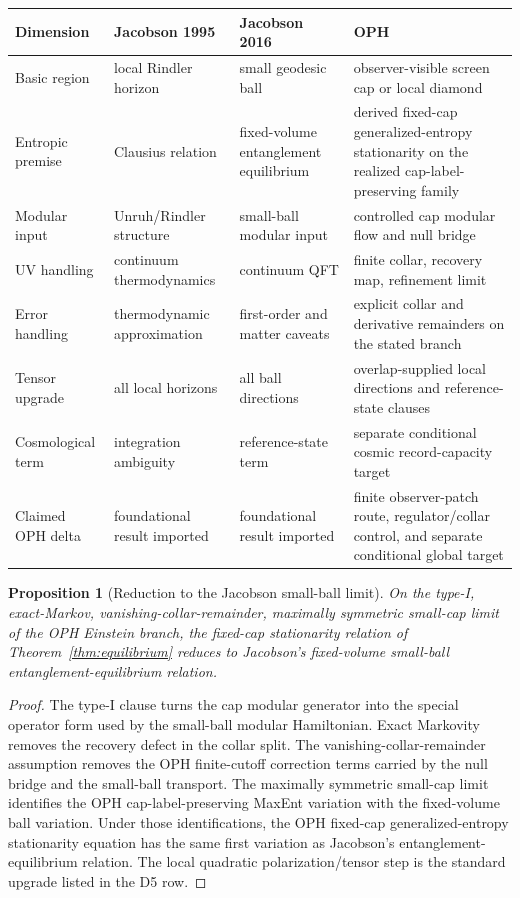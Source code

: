 \documentclass[11pt]{article}
\newtheorem{proposition}[theorem]{Proposition}
\begin{document}
\begingroup
\footnotesize
\begin{longtable}{@{}>{\raggedright\arraybackslash}p{}>{\raggedright\arraybackslash}p{}>{\raggedright\arraybackslash}p{}>{\raggedright\arraybackslash}p{}@{}}
\toprule
Dimension & Jacobson 1995 & Jacobson 2016 & OPH \\
\midrule
\endhead
\bottomrule
\endfoot
Basic region & local Rindler horizon & small geodesic ball & observer-visible screen cap or local diamond \\
Entropic premise & Clausius relation & fixed-volume entanglement equilibrium & derived fixed-cap generalized-entropy stationarity on the realized cap-label-preserving family \\
Modular input & Unruh/Rindler structure & small-ball modular input & controlled cap modular flow and null bridge \\
UV handling & continuum thermodynamics & continuum QFT & finite collar, recovery map, refinement limit \\
Error handling & thermodynamic approximation & first-order and matter caveats & explicit collar and derivative remainders on the stated branch \\
Tensor upgrade & all local horizons & all ball directions & overlap-supplied local directions and reference-state clauses \\
Cosmological term & integration ambiguity & reference-state term & separate conditional cosmic record-capacity target \\
Claimed OPH delta & foundational result imported & foundational result imported & finite observer-patch route, regulator/collar control, and separate conditional global target \\
\end{longtable}
\endgroup

\begin{proposition}[Reduction to the Jacobson small-ball limit]\label{prop:oph-jacobson-reduction}
On the type-I, exact-Markov, vanishing-collar-remainder, maximally symmetric small-cap limit of the
OPH Einstein branch, the fixed-cap stationarity relation of Theorem~\ref{thm:equilibrium} reduces
to Jacobson's fixed-volume small-ball entanglement-equilibrium relation.
\end{proposition}

\begin{proof}
The type-I clause turns the cap modular generator into the special operator form used by the
small-ball modular Hamiltonian. Exact Markovity removes the recovery defect in the collar split.
The vanishing-collar-remainder assumption removes the OPH finite-cutoff correction terms carried
by the null bridge and the small-ball transport. The maximally symmetric small-cap limit identifies
the OPH cap-label-preserving MaxEnt variation with the fixed-volume ball variation. Under those
identifications, the OPH fixed-cap generalized-entropy stationarity equation has the same first
variation as Jacobson's entanglement-equilibrium relation. The local quadratic
polarization/tensor step is the standard upgrade listed in the D5 row.
\end{proof}
\end{document}
